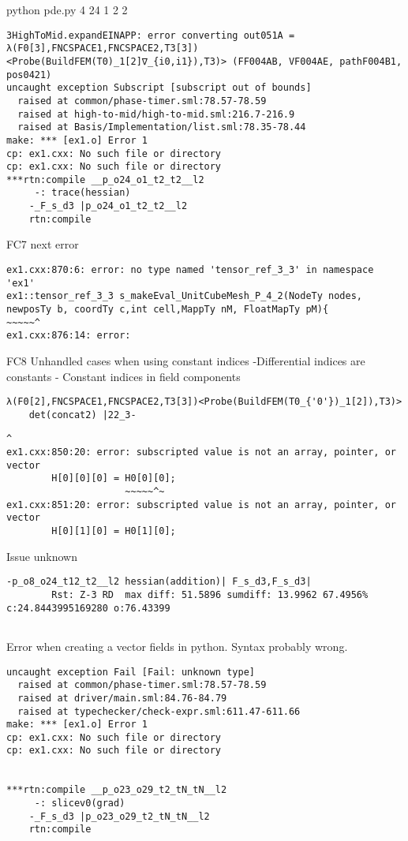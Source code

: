 \begin{description}
 python pde.py 4 24 1 2 2
\begin{lstlisting}[mathescape=true]
3HighToMid.expandEINAPP: error converting out051A = λ(F0[3],FNCSPACE1,FNCSPACE2,T3[3])<Probe(BuildFEM(T0)_1[2]∇_{i0,i1}),T3)> (FF004AB, VF004AE, pathF004B1, pos0421)
uncaught exception Subscript [subscript out of bounds]
  raised at common/phase-timer.sml:78.57-78.59
  raised at high-to-mid/high-to-mid.sml:216.7-216.9
  raised at Basis/Implementation/list.sml:78.35-78.44
make: *** [ex1.o] Error 1
cp: ex1.cxx: No such file or directory
cp: ex1.cxx: No such file or directory
***rtn:compile __p_o24_o1_t2_t2__l2
	 -: trace(hessian)
	-_F_s_d3 |p_o24_o1_t2_t2__l2
	rtn:compile 
	  \end{lstlisting}
\item{FC7}  
	  next error
\begin{lstlisting}[mathescape=true]
	  ex1.cxx:870:6: error: no type named 'tensor_ref_3_3' in namespace 'ex1'
ex1::tensor_ref_3_3 s_makeEval_UnitCubeMesh_P_4_2(NodeTy nodes, newposTy b, coordTy c,int cell,MappTy nM, FloatMapTy pM){
~~~~~^
ex1.cxx:876:14: error:
\end{lstlisting}
\item{FC8}
Unhandled cases when using constant indices
-Differential indices are constants
- Constant indices in field components
\begin{lstlisting}[mathescape=true]
	λ(F0[2],FNCSPACE1,FNCSPACE2,T3[3])<Probe(BuildFEM(T0_{'0'})_1[2]),T3)>
	det(concat2) |22_3- 
	\end{lstlisting}
	
	\item[FC9]
	\begin{lstlisting}[mathescape=true]
                ^
ex1.cxx:850:20: error: subscripted value is not an array, pointer, or vector
        H[0][0][0] = H0[0][0];
                     ~~~~~^~
ex1.cxx:851:20: error: subscripted value is not an array, pointer, or vector
        H[0][1][0] = H0[1][0];
        	\end{lstlisting}
	\item[FT10] 
	Issue unknown       	
   	\begin{lstlisting}[mathescape=true]     	-p_o8_o24_t12_t2__l2 hessian(addition)| F_s_d3,F_s_d3| 
		Rst: Z-3 RD  max diff: 51.5896 sumdiff: 13.9962 67.4956% c:24.8443995169280 o:76.43399
	
    	\end{lstlisting}
    		\item[F11]
    		Error when creating a vector fields in python. Syntax probably wrong.
	\item[F12]
		\begin{lstlisting}[mathescape=true]
uncaught exception Fail [Fail: unknown type]
  raised at common/phase-timer.sml:78.57-78.59
  raised at driver/main.sml:84.76-84.79
  raised at typechecker/check-expr.sml:611.47-611.66
make: *** [ex1.o] Error 1
cp: ex1.cxx: No such file or directory
cp: ex1.cxx: No such file or directory


***rtn:compile __p_o23_o29_t2_tN_tN__l2
	 -: slicev0(grad)
	-_F_s_d3 |p_o23_o29_t2_tN_tN__l2
	rtn:compile 
	\end{lstlisting}
\end{description}
